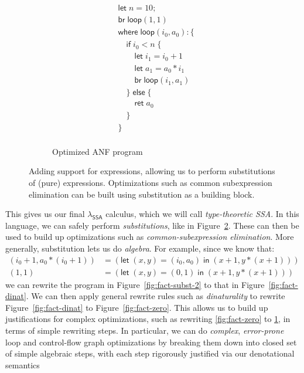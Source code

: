 \documentclass[acmsmall,screen,review]{acmart}
\newcommand{\ms}[1]{\ensuremath{\mathsf{#1}}}
\newcommand{\isotopessa}{\(\lambda_{\ms{SSA}}\)}
\begin{document}
\begin{figure}
\begin{subfigure}[t]{.31\textwidth}
\begin{align*}
      & \ms{let}\;n = 10; \\
      & \ms{br}\;\ms{loop}(1, 1) \\
      & \ms{where}\;\ms{loop}(i_0, a_0): \{\\
      & \quad \ms{if}\;i_0 < n\;\{ \\
      & \qquad \ms{let}\;i_1 = i_0 + 1 \\
      & \qquad \ms{let}\;a_1 = a_0 * i_1 \\
      & \qquad \ms{br}\;\ms{loop}(i_1, a_1) \\
      & \quad \}\;\ms{else}\;\{ \\
      & \qquad \ms{ret}\;a_0 \\
      & \quad \} \\
      & \} \\
    \end{align*}
    \caption{Optimized ANF program}
    \label{fig:fact-opt}
  \end{subfigure}
  \caption{
    Adding support for expressions, allowing us to perform substitutions of (pure) expressions.
    Optimizations such as common subexpression elimination can be built using substitution as a
    building block.
  }
  \Description{}
  \label{fig:fact-cse}
\end{figure}

This gives us our final \isotopessa{} calculus, which we will call \emph{type-theoretic SSA}. In
this language, we can safely perform \textit{substitutions}, like in Figure~\ref{fig:fact-cse}.
These can then be used to build up optimizations such as \textit{common-subexpression elimination}.
More generally, substitution lets us do \textit{algebra}. For example, since we know that:
\begin{align*}
  (i_0 + 1, a_0 * (i_0 + 1)) &= (\ms{let}\;(x, y) = (i_0, a_0)\;\ms{in}\;(x + 1, y * (x + 1))) \\
  (1, 1) &= (\ms{let}\;(x, y) = (0, 1)\;\ms{in}\;(x + 1, y * (x + 1)))
\end{align*} 
we can rewrite the program in Figure~\ref{fig:fact-subst-2} to that in Figure~\ref{fig:fact-dinat}.
We can then apply general rewrite rules such as \textit{dinaturality} to rewrite
Figure~\ref{fig:fact-dinat} to Figure~\ref{fig:fact-zero}. This allows us to build up justifications
for complex optimizations, such as rewriting \ref{fig:fact-zero} to \ref{fig:fact-opt}, in terms of
simple rewriting steps. In particular, we can do \textit{complex}, \textit{error-prone} loop and
control-flow graph optimizations by breaking them down into closed set of simple algebraic steps,
with each step rigorously justified via our denotational semantics
\end{document}
